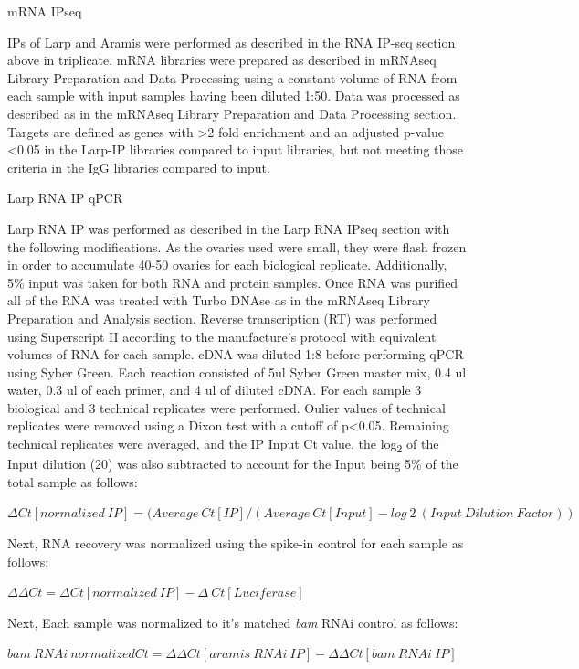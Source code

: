 \documentclass[12pt,twoside]{reedthesis}
\begin{document}
{mRNA IPseq}

IPs of Larp and Aramis were performed as described in the RNA IP-seq
section above in triplicate. mRNA libraries were prepared as described
in mRNAseq Library Preparation and Data Processing using a constant
volume of RNA from each sample with input samples having been diluted
1:50. Data was processed as described as in the mRNAseq Library
Preparation and Data Processing section. Targets are defined as genes
with \textgreater2 fold enrichment and an adjusted p-value \textless0.05 in the Larp-IP
libraries compared to input libraries, but not meeting those criteria in
the IgG libraries compared to input.

{Larp RNA IP qPCR}

Larp RNA IP was performed as described in the Larp RNA IPseq section
with the following modifications. As the ovaries used were small, they
were flash frozen in order to accumulate 40-50 ovaries for each
biological replicate. Additionally, 5\% input was taken for both RNA and
protein samples. Once RNA was purified all of the RNA was treated with
Turbo DNAse as in the {} mRNAseq Library Preparation and
Analysis section. Reverse transcription (RT) was performed using
Superscript II according to the manufacture's protocol with equivalent
volumes of RNA for each sample. cDNA was diluted 1:8 before performing
qPCR using Syber Green. Each reaction consisted of 5ul Syber Green
master mix, 0.4 ul water, 0.3 ul of each primer, and 4 ul of diluted
cDNA. For each sample 3 biological and 3 technical replicates were
performed. Oulier values of technical replicates were removed using a
Dixon test with a cutoff of p\textless0.05. Remaining technical replicates were
averaged, and the IP Input Ct value, the log\textsubscript{2} of the Input dilution
(20) was also subtracted to account for the Input being 5\% of the total
sample as follows:

\(\Delta Ct[normalized\ IP] = (Average\ Ct[IP]/(Average\ Ct[Input] - log~2~(Input\ Dilution\ Factor))\)

Next, RNA recovery was normalized using the spike-in control for each
sample as follows:

\(\Delta \Delta Ct = \Delta Ct[normalized\ IP]-\Delta\ Ct[Luciferase]\)

Next, Each sample was normalized to it's matched \emph{bam} RNAi control as
follows:

\(bam\ RNAi\ normalized Ct= \Delta \Delta Ct[aramis\ RNAi\ IP] - \Delta \Delta Ct[bam\ RNAi\ IP]\)
\end{document}
